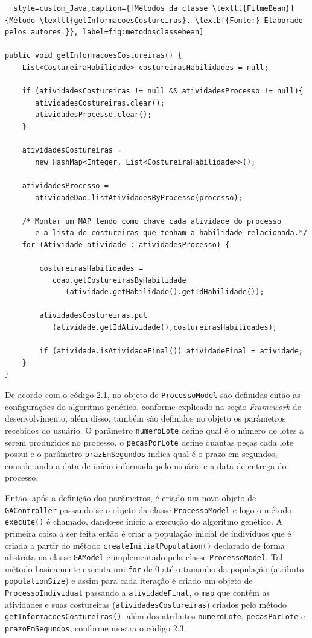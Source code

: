 \begin{lstlisting} [style=custom_Java,caption={[Métodos da classe \texttt{FilmeBean}]{Método \texttt{getInformacoesCostureiras}. \textbf{Fonte:} Elaborado pelos autores.}}, label=fig:metodosclassebean] 	

public void getInformacoesCostureiras() {
	List<CostureiraHabilidade> costureirasHabilidades = null;
	
	if (atividadesCostureiras != null && atividadesProcesso != null){
	   atividadesCostureiras.clear();
	   atividadesProcesso.clear();
	}
	
	atividadesCostureiras = 
	   new HashMap<Integer, List<CostureiraHabilidade>>();
	
	atividadesProcesso = 
	   atividadeDao.listAtividadesByProcesso(processo);
	
	/* Montar um MAP tendo como chave cada atividade do processo 
	   e a lista de costureiras que tenham a habilidade relacionada.*/
	for (Atividade atividade : atividadesProcesso) {
		
		costureirasHabilidades = 
		   cdao.getCostureirasByHabilidade
		      (atividade.getHabilidade().getIdHabilidade());
		
		atividadesCostureiras.put
		   (atividade.getIdAtividade(),costureirasHabilidades);
		
		if (atividade.isAtividadeFinal()) atividadeFinal = atividade;
	}
}

\end{lstlisting}

\par De acordo com o código 2.1, no objeto de \texttt{ProcessoModel} são definidas então as configurações do algoritmo genético, conforme explicado na seção \textit{Framework} de desenvolvimento, além disso, também são definidos no objeto os parâmetros recebidos do usuário. O parâmetro \texttt{numeroLote} define qual é o número de lotes a serem produzidos no processo, o \texttt{pecasPorLote} define quantas peças cada lote possui e o parâmetro \texttt{prazEmSegundos} indica qual é o prazo em segundos, considerando a data de início informada pelo usuário e a data de entrega do processo.

\par Então, após a definição dos parâmetros, é criado um novo objeto de \texttt{GAController} passando-se o 
objeto da classe \texttt{ProcessoModel} e logo o método \texttt{execute()} é chamado, dando-se início  a execução do
algoritmo genético. A primeira coisa a ser feita então é criar a população inicial de indivíduos que é criada a  partir do método \texttt{createInitialPopulation()} declarado de forma abstrata na classe \texttt{GAModel} e implementado pela classe 
\texttt{ProcessoModel}. Tal método basicamente executa um \texttt{for} de 0 até o tamanho da população (atributo 
\texttt{populationSize}) e assim para cada iteração é criado um objeto de \texttt{ProcessoIndividual} passando a 
\texttt{atividadeFinal}, o \texttt{map} que contém as atividades e suas costureiras (\texttt{atividadesCostureiras}) criados 
pelo método \texttt{getInformacoesCostureiras()}, além dos atributos \texttt{numeroLote}, \texttt{pecasPorLote} e
\texttt{prazoEmSegundos}, conforme mostra o código 2.3.


